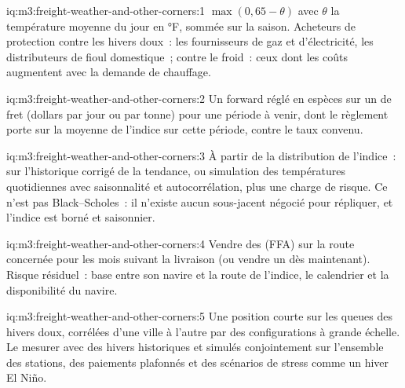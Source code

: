 \begin{solution}{iq:m3:freight-weather-and-other-corners:1}
$\max(0, 65 - \theta)$ avec $\theta$ la température moyenne du jour en °F, sommée sur la saison. Acheteurs de
protection contre les hivers doux~: les fournisseurs de gaz et d'électricité, les distributeurs de fioul domestique~; contre le froid~: ceux dont les
coûts augmentent avec la demande de chauffage.
\end{solution}

\begin{solution}{iq:m3:freight-weather-and-other-corners:2}
Un forward réglé en espèces sur un  de fret (dollars par jour ou par tonne) pour une période à venir,
dont le règlement porte sur la moyenne de l'indice sur cette période, contre le taux convenu.
\end{solution}

\begin{solution}{iq:m3:freight-weather-and-other-corners:3}
À partir de la distribution de l'indice~:  sur l'historique corrigé de la tendance, ou simulation des températures quotidiennes avec
saisonnalité et autocorrélation, plus une charge de risque. Ce n'est pas Black--Scholes~: il n'existe aucun sous-jacent négocié pour
répliquer, et l'indice est borné et saisonnier.
\end{solution}

\begin{solution}{iq:m3:freight-weather-and-other-corners:4}
Vendre des  (FFA) sur la route concernée pour les mois suivant la livraison (ou vendre un  dès maintenant). Risque résiduel~:
base entre son navire et la route de l'indice, le calendrier et la disponibilité du navire.
\end{solution}

\begin{solution}{iq:m3:freight-weather-and-other-corners:5}
Une position courte sur les queues des hivers doux, corrélées d'une ville à l'autre par des configurations à grande échelle. Le mesurer avec
des hivers historiques et simulés conjointement sur l'ensemble des stations, des paiements plafonnés et des scénarios de stress comme un
hiver El Niño.
\end{solution}

